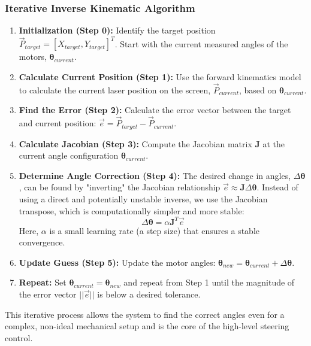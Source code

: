 \documentclass[12pt]{article}
\begin{document}
\subsubsection{Iterative Inverse Kinematic Algorithm}
\begin{enumerate}
    \item \textbf{Initialization (Step 0):} Identify the target position \(\vec{P}_{target} = [X_{target}, Y_{target}]^T\). Start with the current measured angles of the motors, \(\boldsymbol{\theta}_{current}\).
    \item \textbf{Calculate Current Position (Step 1):} Use the forward kinematics model to calculate the current laser position on the screen, \(\vec{P}_{current}\), based on \(\boldsymbol{\theta}_{current}\).
    \item \textbf{Find the Error (Step 2):} Calculate the error vector between the target and current position: \(\vec{e} = \vec{P}_{target} - \vec{P}_{current}\).
    \item \textbf{Calculate Jacobian (Step 3):} Compute the Jacobian matrix \(\mathbf{J}\) at the current angle configuration \(\boldsymbol{\theta}_{current}\).
    \item \textbf{Determine Angle Correction (Step 4):} The desired change in angles, \(\Delta\boldsymbol{\theta}\), can be found by "inverting" the Jacobian relationship \(\vec{e} \approx \mathbf{J} \Delta\boldsymbol{\theta}\). Instead of using a direct and potentially unstable inverse, we use the Jacobian transpose, which is computationally simpler and more stable:
    \begin{equation}
        \Delta\boldsymbol{\theta} = \alpha \mathbf{J}^T \vec{e}
    \end{equation}
    Here, \(\alpha\) is a small learning rate (a step size) that ensures a stable convergence.
    \item \textbf{Update Guess (Step 5):} Update the motor angles: \(\boldsymbol{\theta}_{new} = \boldsymbol{\theta}_{current} + \Delta\boldsymbol{\theta}\).
    \item \textbf{Repeat:} Set \(\boldsymbol{\theta}_{current} = \boldsymbol{\theta}_{new}\) and repeat from Step 1 until the magnitude of the error vector \(||\vec{e}||\) is below a desired tolerance.
\end{enumerate}
This iterative process allows the system to find the correct angles even for a complex, non-ideal mechanical setup and is the core of the high-level steering control.
\end{document}
